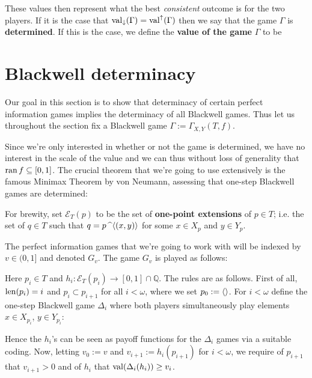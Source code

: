 These values then represent what the best \textit{consistent} outcome is for the two players. If it is the case that $\operatorname{val}_\downarrow(\Gamma)=\operatorname{val}^\uparrow(\Gamma)$ then we say that the game $\Gamma$ is \textbf{determined}. If this is the case, we define the \textbf{value of the game} $\Gamma$ to be

\section{Blackwell determinacy}

Our goal in this section is to show that determinacy of certain perfect information games implies the determinacy of all Blackwell games. Thus let us throughout the section fix a Blackwell game $\Gamma:=\Gamma_{X,Y}(T,f)$.

\qquad Since we're only interested in whether or not the game is determined, we have no interest in the scale of the value and we can thus without loss of generality that $\operatorname{ran} f\subseteq[0,1]$. The crucial theorem that we're going to use extensively is the famous Minimax Theorem by von Neumann, assessing that one-step Blackwell games are determined:


For brewity, set $\mathcal{E}_T(p)$ to be the set of \textbf{one-point extensions} of $p\in T$; i.e. the set of $q\in T$ such that $q=p\operatorname{\text{\textasciicircum}}\langle (x,y)\rangle$ for some $x\in X_p$ and $y\in Y_p$.

\qquad The perfect information games that we're going to work with will be indexed by $v\in (0,1]$ and denoted $G_v$. The game $G_v$ is played as follows:

Here $p_i\in T$ and $h_i:\mathcal{E}_T(p_i)\to[0,1]\cap\mathbb{Q}$. The rules are as follows. First of all, $\operatorname{len}(p_i)=i$ and $p_i\subset p_{i+1}$ for all $i<\omega$, where we set $p_0:=\langle \rangle$. For $i<\omega$ define the one-step Blackwell game $\Delta_i$ where both players simultaneously play elements $x\in X_{p_i}$, $y\in Y_{p_i}$:

Hence the $h_i$'s can be seen as payoff functions for the $\Delta_i$ games via a suitable coding. Now, letting $v_0:=v$ and $v_{i+1}:=h_i(p_{i+1})$ for $i<\omega$, we require of $p_{i+1}$ that $v_{i+1}>0$ and of $h_i$ that $\operatorname{val}(\Delta_i(h_i))\geq v_i$.

